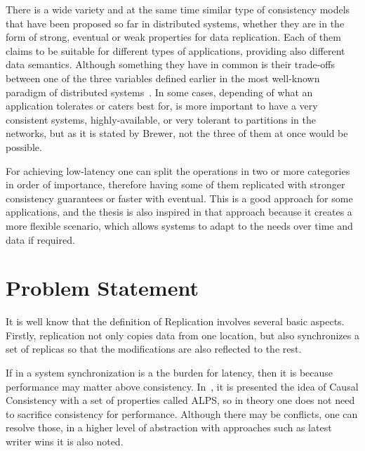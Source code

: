 There is a wide variety and at the same time similar type of consistency models that have been proposed so far in distributed systems, whether they are in the form of strong, eventual or weak properties for data replication. Each of them claims to be suitable for different types of applications, providing also different data semantics. Although something they have in common is their trade-offs between one of the three variables defined earlier in the most well-known paradigm of distributed systems~\cite{Brewer:2002}. In some cases, depending of what an application tolerates or caters best for, is more important to have a very consistent systems, highly-available, or very tolerant to partitions in the networks, but as it is stated by Brewer, not the three of them at once would be possible.

% 
% 

For achieving low-latency one can split the operations in two or more categories in order of importance, therefore having some of them replicated with stronger consistency guarantees or faster with eventual\cite{Li:2012}. This is a good approach for some applications, and the thesis is also inspired in that approach because it creates a more flexible scenario, which allows systems to adapt to the needs over time and data if required.


\section{Problem Statement}

It is well know that the definition of Replication involves several basic aspects. Firstly, replication not only copies data from one location, but also synchronizes a set of replicas so that the modifications are also reflected to the rest.

If in a system synchronization is a the burden for latency, then it is because performance may matter above consistency. In~\cite{Lloyd:2011}, it is presented the idea of Causal Consistency with a set of properties called ALPS, so in theory one does not need to sacrifice consistency for performance. Although there may be conflicts, one can resolve those, in a higher level of abstraction with approaches such as latest writer wins it is also noted.

